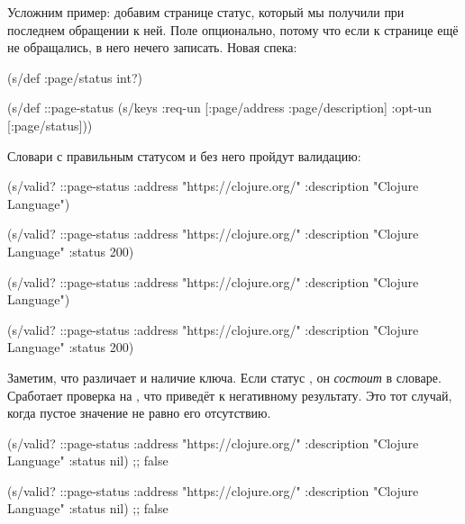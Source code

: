 \fi

Усложним пример: добавим странице статус, который мы получили при
последнем обращении к ней. Поле опционально, потому что если к странице ещё не
обращались, в него нечего записать. Новая спека:


\begin{clojure}
(s/def :page/status int?)

(s/def ::page-status
  (s/keys :req-un [:page/address
                   :page/description]
          :opt-un [:page/status]))
\end{clojure}


Словари с правильным статусом и без него пройдут валидацию:

\ifnarrow


\begin{clojure}
(s/valid? ::page-status
  {:address "https://clojure.org/"
   :description "Clojure Language"})

(s/valid? ::page-status
  {:address "https://clojure.org/"
   :description "Clojure Language"
   :status 200})
\end{clojure}


\else


\begin{clojure}
(s/valid? ::page-status
          {:address "https://clojure.org/"
           :description "Clojure Language"})

(s/valid? ::page-status
          {:address "https://clojure.org/"
           :description "Clojure Language"
           :status 200})
\end{clojure}


\fi


Заметим, что  различает  и наличие ключа. Если статус
, он \emph{состоит} в словаре. Сработает проверка  на
, что приведёт к негативному результату. Это тот случай, когда пустое
значение не равно его отсутствию.

\ifnarrow


\begin{clojure}
(s/valid? ::page-status
  {:address "https://clojure.org/"
   :description "Clojure Language"
   :status nil})
;; false
\end{clojure}


\else


\begin{clojure}
(s/valid? ::page-status
          {:address "https://clojure.org/"
           :description "Clojure Language"
           :status nil})
;; false
\end{clojure}



